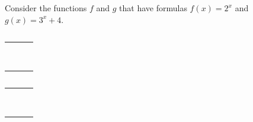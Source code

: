 \begin{exercises}
\begin{problem}\label{exp:prob:increasingexptabs}%
Consider the functions $f$ and $g$ that have formulas $f(x) = 2^x$ and $g(x) = 3^x+4$.  
\begin{table}[!htb]
	\centering
	\begin{minipage}{.3\textwidth}
		\centering
		\caption{}
		\label{exp:tab:increasingexp}
		\begin{tabular}{S[table-format=1.0]rr}
			\beforeheading
			 &  &  \\
			            &                  &                  \\            &                  &                  \\            &                  &                  \\             &                  &                  \\             &                  &                  \\             &                  &                  \\\lastline
		\end{tabular}
	\end{minipage}%
	\hfill
	\begin{minipage}{.3\textwidth}
		\centering
		\begin{tabular}{S[table-format=1.0]rr}
			\beforeheading
			 &  &  \\
			            &                  &                  \\            &                  &                  \\            &                  &                  \\             &                  &                  \\             &                  &                  \\             &                  &                  \\\lastline
		\end{tabular}
		\label{exp:tab:decreasingexp}
	\end{minipage}%
	\hfill\mbox{}
\end{table}


\end{problem}
\end{exercises}
